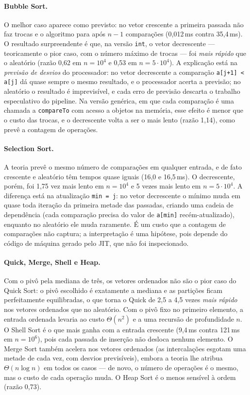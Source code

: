 \documentclass[11pt,a4paper]{article}
\begin{document}
\paragraph{Bubble Sort.} O melhor caso aparece como previsto: no vetor crescente a primeira passada
não faz trocas e o algoritmo para após $n-1$ comparações (0,012\,ms contra 35,4\,ms). O resultado
surpreendente é que, na versão \texttt{int}, o vetor decrescente --- teoricamente o pior caso, com o
número máximo de trocas --- foi \emph{mais rápido} que o aleatório (razão 0,62 em $n=10^4$ e 0,53 em
$n=5\cdot10^4$). A explicação está na \emph{previsão de desvios} do processador: no vetor
decrescente a comparação \texttt{a[j+1] < a[j]} dá quase sempre o mesmo resultado, e o processador
acerta a previsão; no aleatório o resultado é imprevisível, e cada erro de previsão descarta o
trabalho especulativo do pipeline. Na versão genérica, em que cada comparação é uma chamada a
\texttt{compareTo} com acesso a objetos na memória, esse efeito é menor que o custo das trocas, e
o decrescente volta a ser o mais lento (razão 1,14), como prevê a contagem de operações.

\paragraph{Selection Sort.} A teoria prevê o mesmo número de comparações em qualquer entrada, e
de fato crescente e aleatório têm tempos quase iguais (16,0 e 16,5\,ms). O decrescente, porém, foi
1,75 vez mais lento em $n=10^4$ e 5 vezes mais lento em $n=5\cdot10^4$. A diferença está na
atualização \texttt{min = j}: no vetor decrescente o mínimo muda em quase toda iteração da primeira
metade das passadas, criando uma cadeia de dependência (cada comparação precisa do valor de
\texttt{a[min]} recém-atualizado), enquanto no aleatório ele muda raramente. É um custo que a
contagem de comparações não captura; a interpretação é uma hipótese, pois depende do código de
máquina gerado pelo JIT, que não foi inspecionado.

\paragraph{Quick, Merge, Shell e Heap.} Com o pivô pela mediana de três, os vetores ordenados não
são o pior caso do Quick Sort: o pivô escolhido é exatamente a mediana e as partições ficam
perfeitamente equilibradas, o que torna o Quick de 2,5 a 4,5 vezes \emph{mais rápido} nos vetores
ordenados que no aleatório. Com o pivô fixo no primeiro elemento, a entrada ordenada levaria ao
custo $\Theta(n^2)$ e a uma recursão de profundidade $n$. O Shell Sort é o que mais ganha com
a entrada crescente (9,4\,ms contra 121\,ms em $n=10^6$), pois cada passada de inserção não
desloca nenhum elemento. O Merge Sort também acelera nos vetores ordenados (as intercalações
esgotam uma metade de cada vez, com desvios previsíveis), embora a teoria lhe atribua
$\Theta(n\log n)$ em todos os casos --- de novo, o número de operações é o mesmo, mas o custo de
cada operação muda. O Heap Sort é o menos sensível à ordem (razão 0,73).
\end{document}
